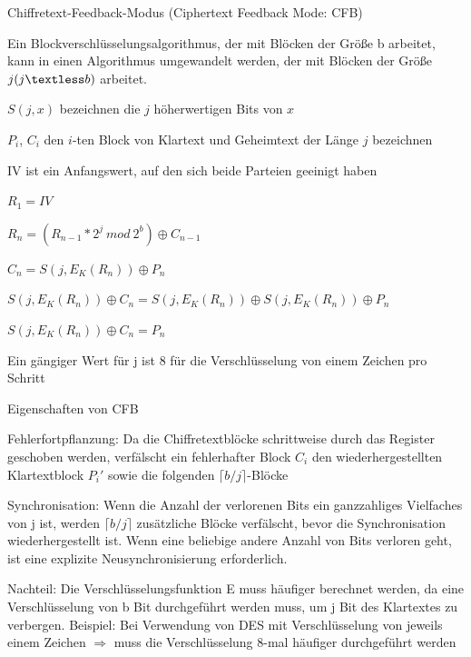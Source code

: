 \documentclass[a4paper]{article}
\begin{document}
\begin{multicols}{3}
      Chiffretext-Feedback-Modus (Ciphertext Feedback Mode: CFB)

      \begin{itemize*}
            \item Ein Blockverschlüsselungsalgorithmus, der mit Blöcken der Größe b
            arbeitet, kann in einen Algorithmus umgewandelt werden, der mit
            Blöcken der Größe $j (j\textless b)$ arbeitet.
            \begin{itemize*}
                  \item $S(j, x)$ bezeichnen die $j$ höherwertigen Bits von $x$
                  \item $P_i$, $C_i$ den $i$-ten Block von Klartext und Geheimtext der Länge $j$ bezeichnen
                  \item IV ist ein Anfangswert, auf den sich beide Parteien geeinigt haben
                  \item $R_1 = IV$
                  \item $R_n = (R_{n-1}*2^j\ mod\ 2^b)\oplus C_{n-1}$
                  \item $C_n = S(j,E_K(R_n))\oplus P_n$
                  \item $S(j,E_K(R_n))\oplus C_n = S(j,E_K(R_n))\oplus S(j,E_K(R_n))\oplus P_n$
                  \item $S(j,E_K(R_n))\oplus C_n = P_n$
            \end{itemize*}
            \item Ein gängiger Wert für j ist 8 für die Verschlüsselung von einem
            Zeichen pro Schritt
            \item Eigenschaften von CFB
            \begin{itemize*}
                  \item Fehlerfortpflanzung: Da die Chiffretextblöcke schrittweise durch das Register geschoben werden, verfälscht ein fehlerhafter Block $C_i$ den wiederhergestellten Klartextblock $P_i'$ sowie die folgenden $\lceil b / j\rceil$-Blöcke
                  \item Synchronisation: Wenn die Anzahl der verlorenen Bits ein ganzzahliges Vielfaches von j ist, werden $\lceil b / j\rceil$ zusätzliche Blöcke verfälscht, bevor die Synchronisation wiederhergestellt ist. Wenn eine beliebige andere Anzahl von Bits verloren geht, ist eine explizite Neusynchronisierung erforderlich.
                  \item Nachteil: Die Verschlüsselungsfunktion E muss häufiger berechnet werden, da eine Verschlüsselung von b Bit durchgeführt werden muss, um j Bit des Klartextes zu verbergen. Beispiel: Bei Verwendung von DES mit Verschlüsselung von jeweils einem Zeichen $\Rightarrow$ muss die Verschlüsselung 8-mal häufiger durchgeführt werden
            \end{itemize*}
      \end{itemize*}


\end{multicols}
\end{document}
